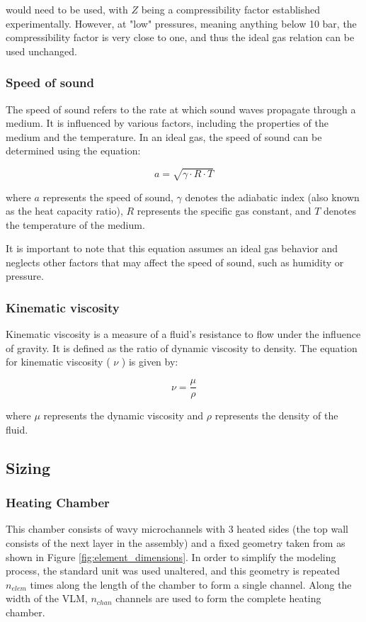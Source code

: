 \documentclass{homework}
\begin{document}
\begin{multicols}{2}
        would need to be used, with $Z$ being a compressibility factor established experimentally. However, at "low" pressures, meaning anything below 10 bar, the compressibility factor is very close to one, and thus the ideal gas relation can be used unchanged. \cite{Libretexts_2022}
        
\subsubsection{Speed of sound}
	    
	  The speed of sound refers to the rate at which sound waves propagate through a medium. It is influenced by various factors, including the properties of the medium and the temperature. In an ideal gas, the speed of sound can be determined using the equation:  
	    
	  $$
	  a = \sqrt{\gamma \cdot R \cdot T}
	  $$  
	    
	  where
	  $a$ represents the speed of sound,  
	  $\gamma$ denotes the adiabatic index (also known as the heat capacity ratio),  
	  $R$ represents the specific gas constant, and  
	  $T$ denotes the temperature of the medium.  
	    
	  It is important to note that this equation assumes an ideal gas behavior and neglects other factors that may affect the speed of sound, such as humidity or pressure.  
\subsubsection{Kinematic viscosity}
	    
	  Kinematic viscosity is a measure of a fluid's resistance to flow under the influence of gravity. It is defined as the ratio of dynamic viscosity to density. The equation for kinematic viscosity ( $\nu$ ) is given by:  
	    
	  $$\nu = \frac{\mu}{\rho}$$  
	    
	  where $\mu$ represents the dynamic viscosity and $\rho$ represents the density of the fluid.  
\subsection{Sizing}

\subsubsection{Heating Chamber}
	  This chamber consists of wavy microchannels with 3 heated sides (the top wall consists of the next layer in the assembly) and a fixed geometry taken from \cite{bianchi_micropropulsion_nodate} as shown in Figure \ref{fig:element_dimensions}. In order to simplify the modeling process, the standard unit was used unaltered, and this geometry is repeated $n_{elem}$ times along the length of the chamber to form a single channel. Along the width of the VLM, $n_{chan}$ channels are used to form the complete heating chamber.


\end{multicols}
\end{document}
